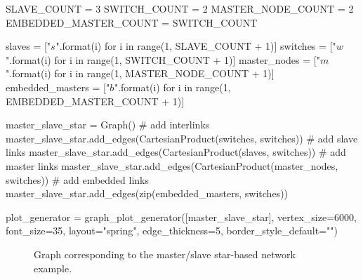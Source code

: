 \documentclass[times,a4paper,10pt,twocolumn]{article}
\theoremstyle{definition}
\theoremstyle{definition}
\theoremstyle{plain}
\begin{document}
\begin{sagesilent}

SLAVE_COUNT = 3
SWITCH_COUNT = 2
MASTER_NODE_COUNT = 2
EMBEDDED_MASTER_COUNT = SWITCH_COUNT

slaves = ["$s_{}$".format(i) for i in range(1, SLAVE_COUNT + 1)]
switches = ["$w_{}$".format(i) for i in range(1, SWITCH_COUNT + 1)]
master_nodes = ["$m_{}$".format(i) for i in range(1, MASTER_NODE_COUNT + 1)]
embedded_masters = ["$b_{}$".format(i) for i in
    range(1, EMBEDDED_MASTER_COUNT + 1)]

master_slave_star = Graph()
# add interlinks
master_slave_star.add_edges(CartesianProduct(switches, switches))
# add slave links
master_slave_star.add_edges(CartesianProduct(slaves, switches))
# add master links
master_slave_star.add_edges(CartesianProduct(master_nodes, switches))
# add embedded links
master_slave_star.add_edges(zip(embedded_masters, switches))

plot_generator = graph_plot_generator([master_slave_star], vertex_size=6000,
    font_size=35, layout="spring", edge_thickness=5, border_style_default="")

\end{sagesilent}

\begin{figure}
\centering
{}
\caption{Graph corresponding to the master/slave star-based network example.}
\label{fig:master-slave-star}
\end{figure}


\end{document}
